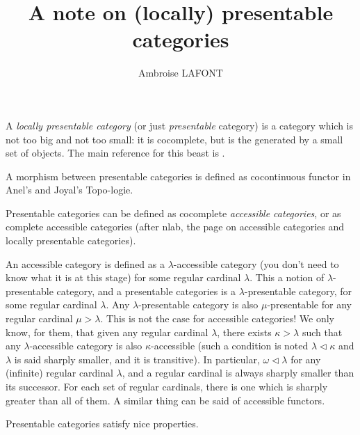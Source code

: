\documentclass{article}
\title{A note on (locally) presentable categories}
\author{Ambroise LAFONT}
\begin{document}
\maketitle

\tableofcontents

A \emph{locally presentable category} (or just \emph{presentable} category) is a
category which is not too big and not too small: it is cocomplete, but is the
generated by a small set of objects.
The main reference for this beast is \cite{adamek_rosicky}.


A morphism between presentable categories is defined as cocontinuous functor in
Anel's and Joyal's Topo-logie.

Presentable categories can be defined as
cocomplete \emph{accessible categories}, or as complete accessible categories
(after nlab, the page on accessible categories and locally presentable categories).

An accessible category is defined as a $\lambda$-accessible category (you don't
need to know what it is at this stage) for some
regular cardinal $\lambda$. This a notion of $\lambda$-presentable category, and
a presentable categories is a $\lambda$-presentable category, for some regular
cardinal $\lambda$. Any $\lambda$-presentable category is also $\mu$-presentable
for any regular cardinal $\mu>\lambda$. This is not the case for accessible
categories! We only know, for them, that given any regular cardinal $\lambda$,
there exists $\kappa>\lambda$ such that any $\lambda$-accessible category is
also $\kappa$-accessible \cite[Theorem 2.11]{adamek_rosicky} (such a condition
is noted $\lambda \triangleleft \kappa$ and $\lambda$ is said sharply smaller,
and it is transitive).
In particular, $\omega\triangleleft \lambda$ for any (infinite) regular cardinal
$\lambda$, and a regular cardinal is always sharply smaller than its successor.
For each set of regular cardinals, there is one which is sharply greater than
all of them. A similar thing can be said of accessible functors.


Presentable categories satisfy nice properties.
\end{document}
